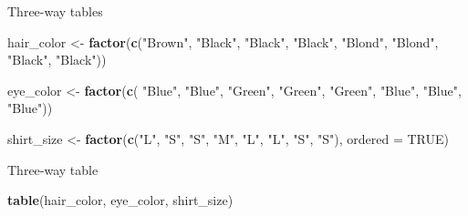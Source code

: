 \documentclass[ignorenonframetext,]{beamer}
\newenvironment{Shaded}{\begin{snugshade}}{\end{snugshade}}
\newcommand{\DataTypeTok}[1]{\textcolor[rgb]{0.13,0.29,0.53}{#1}}
\newcommand{\KeywordTok}[1]{\textcolor[rgb]{0.13,0.29,0.53}{\textbf{#1}}}
\newcommand{\NormalTok}[1]{#1}
\newcommand{\OtherTok}[1]{\textcolor[rgb]{0.56,0.35,0.01}{#1}}
\newcommand{\StringTok}[1]{\textcolor[rgb]{0.31,0.60,0.02}{#1}}
\begin{document}
\begin{frame}[fragile]{Three-way tables}
\protect\hypertarget{three-way-tables}{}

\begin{Shaded}
\begin{Highlighting}[]
\NormalTok{hair_color <-}\StringTok{ }\KeywordTok{factor}\NormalTok{(}\KeywordTok{c}\NormalTok{(}\StringTok{"Brown"}\NormalTok{, }\StringTok{"Black"}\NormalTok{, }\StringTok{"Black"}\NormalTok{, }
                         \StringTok{"Black"}\NormalTok{, }\StringTok{"Blond"}\NormalTok{, }\StringTok{"Blond"}\NormalTok{, }
                         \StringTok{"Black"}\NormalTok{, }\StringTok{"Black"}\NormalTok{))}
                         
\NormalTok{eye_color <-}\StringTok{ }\KeywordTok{factor}\NormalTok{(}\KeywordTok{c}\NormalTok{( }\StringTok{"Blue"}\NormalTok{, }\StringTok{"Blue"}\NormalTok{, }\StringTok{"Green"}\NormalTok{,}
                         \StringTok{"Green"}\NormalTok{, }\StringTok{"Green"}\NormalTok{, }\StringTok{"Blue"}\NormalTok{, }
                         \StringTok{"Blue"}\NormalTok{, }\StringTok{"Blue"}\NormalTok{))}
                         
\NormalTok{shirt_size <-}\StringTok{ }\KeywordTok{factor}\NormalTok{(}\KeywordTok{c}\NormalTok{(}\StringTok{"L"}\NormalTok{, }\StringTok{"S"}\NormalTok{, }\StringTok{"S"}\NormalTok{, }\StringTok{"M"}\NormalTok{, }\StringTok{"L"}\NormalTok{, }
                         \StringTok{"L"}\NormalTok{, }\StringTok{"S"}\NormalTok{, }\StringTok{"S"}\NormalTok{),}
                       \DataTypeTok{ordered =} \OtherTok{TRUE}\NormalTok{)}
\end{Highlighting}
\end{Shaded}

\end{frame}

\begin{frame}[fragile]{Three-way table}
\protect\hypertarget{three-way-table}{}

\begin{Shaded}
\begin{Highlighting}[]
\KeywordTok{table}\NormalTok{(hair_color, eye_color, shirt_size)}
\end{Highlighting}
\end{Shaded}

\end{frame}
\end{document}
